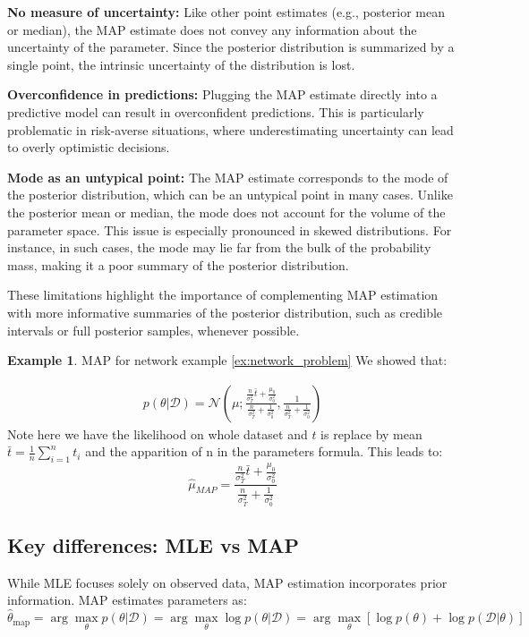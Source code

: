 \documentclass[12pt, a4paper]{article}
\theoremstyle{definition}
\newtheorem{example}{Example}[section]
\numberwithin{figure}{section}
\numberwithin{equation}{section}
\numberwithin{table}{section}
\begin{document}
\textbf{No measure of uncertainty:} Like other point estimates (e.g., posterior mean or median), the MAP estimate does not convey any information about the uncertainty of the parameter. Since the posterior distribution is summarized by a single point, the intrinsic uncertainty of the distribution is lost.

\textbf{Overconfidence in predictions:} Plugging the MAP estimate directly into a predictive model can result in overconfident predictions. This is particularly problematic in risk-averse situations, where underestimating uncertainty can lead to overly optimistic decisions.

\textbf{Mode as an untypical point:} The MAP estimate corresponds to the mode of the posterior distribution, which can be an untypical point in many cases. Unlike the posterior mean or median, the mode does not account for the volume of the parameter space. This issue is especially pronounced in skewed distributions. For instance, in such cases, the mode may lie far from the bulk of the probability mass, making it a poor summary of the posterior distribution.

These limitations highlight the importance of complementing MAP estimation with more informative summaries of the posterior distribution, such as credible intervals or full posterior samples, whenever possible.

\begin{example}{MAP for network example \ref{ex:network_problem}}
We showed that:

\begin{align}
p(\theta | \mathcal{D}) =\mathcal{N}(\mu; \frac{\frac{n}{\sigma_T^2} \bar{t}+ \frac{\mu_0}{\sigma_0^2}}{\frac{n}{\sigma_T^2} + \frac{1}{\sigma_0^2}},\frac{1}{\frac{n}{\sigma_T^2} + \frac{1}{\sigma_0^2}})
\end{align}
Note here we have the likelihood on whole dataset and $t$ is replace by mean $\bar{t}=\frac{1}{n}\sum_{i=1}^n t_i$ and the apparition of n in the parameters formula. This leads to:
$$\hat{\mu}_{MAP}=\frac{\frac{n}{\sigma_T^2} \bar{t}+ \frac{\mu_0}{\sigma_0^2}}{\frac{n}{\sigma_T^2} + \frac{1}{\sigma_0^2}}$$

\end{example}

\subsection{Key differences: MLE vs MAP}
While MLE focuses solely on observed data, MAP estimation incorporates prior information. MAP estimates parameters as:
\begin{equation}
\hat{\theta}_{\text{map}} = \arg\max_{\theta} p(\theta | \mathcal{D}) = \arg\max_{\theta} \log p(\theta | \mathcal{D}) = \arg\max_{\theta} \left[ \log p(\theta) + \log p(\mathcal{D} | \theta) \right]
\end{equation}
\end{document}
